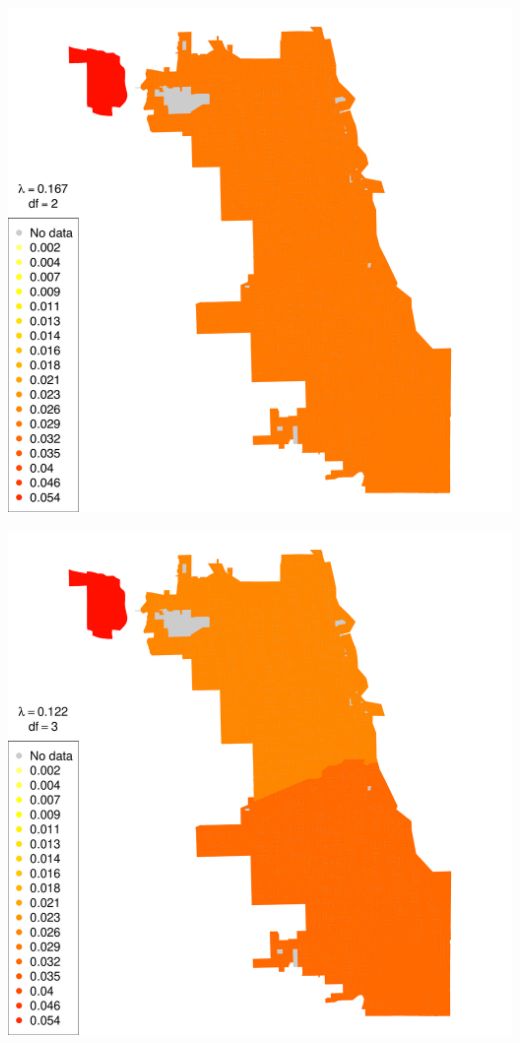 \begin{frame}

  \includegraphics[height=\textheight]{img/chicago_rob_2df.pdf}

\end{frame}

\begin{frame}

  \includegraphics[height=\textheight]{img/chicago_rob_3df.pdf}

\end{frame}

